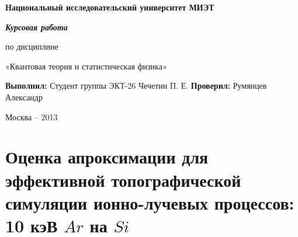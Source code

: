 \documentclass[a4paper,fontsize=12pt]{article}
\newcommand{\kev}{кэ\uppercase{В}}
\begin{document}

%

\begin{titlepage}
  \thispagestyle{empty}

  \begin{center}
    \Large{\textbf{Национальный исследовательский университет МИЭТ}}

    \vspace{5cm}

    \huge{\textbf{\textit{Курсовая работа}}}

    \large{по дисциплине}

    \large{«Квантовая теория и статистическая физика»}

    \vspace{5cm}

  \end{center}

  \vspace{1cm}

  \begin{flushright}
    \textbf{Выполнил:}                  \linebreak
    Студент группы ЭКТ-26               \linebreak
    Чечетин П. Е.                       \linebreak
    \textbf{Проверил:}                  \linebreak
    Румянцев Александр                   \linebreak
  \end{flushright}

  \vfill

  \begin{center}
    \Large{Москва – 2013}
  \end{center}
\end{titlepage}

\newpage

\tableofcontents

\newpage
\part{Оценка апроксимации для эффективной топографической симуляции ионно-лучевых процессов: 10 \kev{} $Ar$ на $Si$}
\end{document}
